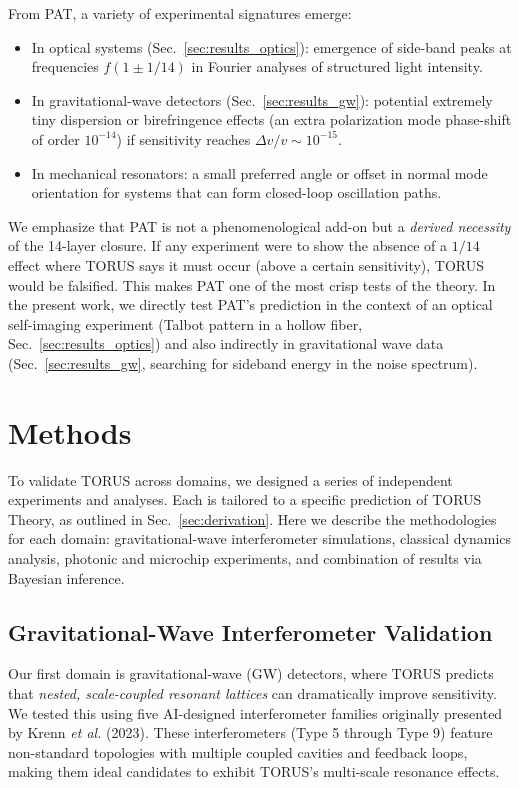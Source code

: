 \documentclass[12pt]{article}
\begin{document}
From PAT, a variety of experimental signatures emerge:
\begin{itemize}\itemsep 0pt
    \item In optical systems (Sec.~\ref{sec:results_optics}): emergence of side-band peaks at frequencies $f(1\pm 1/14)$ in Fourier analyses of structured light intensity.
    \item In gravitational-wave detectors (Sec.~\ref{sec:results_gw}): potential extremely tiny dispersion or birefringence effects (an extra polarization mode phase-shift of order $10^{-14}$) if sensitivity reaches $\Delta v/v \sim 10^{-15}$.
    \item In mechanical resonators: a small preferred angle or offset in normal mode orientation for systems that can form closed-loop oscillation paths.
\end{itemize}

We emphasize that PAT is not a phenomenological add-on but a \emph{derived necessity} of the 14-layer closure. If any experiment were to show the absence of a $1/14$ effect where TORUS says it must occur (above a certain sensitivity), TORUS would be falsified. This makes PAT one of the most crisp tests of the theory. In the present work, we directly test PAT’s prediction in the context of an optical self-imaging experiment (Talbot pattern in a hollow fiber, Sec.~\ref{sec:results_optics}) and also indirectly in gravitational wave data (Sec.~\ref{sec:results_gw}, searching for sideband energy in the noise spectrum).

\section{Methods}\label{sec:methods}
To validate TORUS across domains, we designed a series of independent experiments and analyses. Each is tailored to a specific prediction of TORUS Theory, as outlined in Sec.~\ref{sec:derivation}. Here we describe the methodologies for each domain: gravitational-wave interferometer simulations, classical dynamics analysis, photonic and microchip experiments, and combination of results via Bayesian inference.

\subsection{Gravitational-Wave Interferometer Validation}\label{sec:methods_gw}
Our first domain is gravitational-wave (GW) detectors, where TORUS predicts that \emph{nested, scale-coupled resonant lattices} can dramatically improve sensitivity. We tested this using five AI-designed interferometer families originally presented by Krenn \emph{et al.} (2023). These interferometers (Type 5 through Type 9) feature non-standard topologies with multiple coupled cavities and feedback loops, making them ideal candidates to exhibit TORUS’s multi-scale resonance effects.
\end{document}
